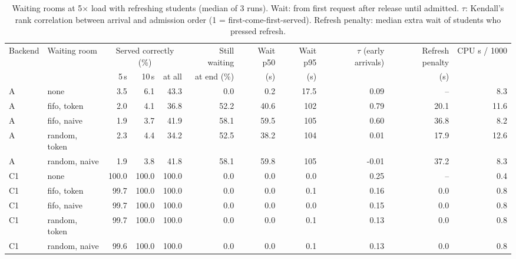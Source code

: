 \begin{table}[t]
\caption{Waiting rooms at 5$\times$ load with refreshing students (median of 3 runs). Wait: from first request after release until admitted. $\tau$: Kendall's rank correlation between arrival and admission order (1 = first-come-first-served). Refresh penalty: median extra wait of students who pressed refresh.}
\label{tab:wr}
\centering
\footnotesize
\begin{tabular}{@{}llrrrrrrrrr@{}}
\toprule
Backend & Waiting room & \multicolumn{3}{c}{Served correctly (\%)} & Still waiting & Wait p50 & Wait p95 & $\tau$ (early arrivals) & Refresh penalty & CPU s / 1000 \\
\cmidrule(lr){3-5}
 & & 5\,s & 10\,s & at all & at end (\%) & (s) & (s) & & (s) & \\
\midrule
A & none & 3.5 & 6.1 & 43.3 & 0.0 & 0.2 & 17.5 & 0.09 & -- & 8.3 \\
A & fifo, token & 2.0 & 4.1 & 36.8 & 52.2 & 40.6 & 102 & 0.79 & 20.1 & 11.6 \\
A & fifo, naive & 1.9 & 3.7 & 41.9 & 58.1 & 59.5 & 105 & 0.60 & 36.8 & 8.2 \\
A & random, token & 2.3 & 4.4 & 34.2 & 52.5 & 38.2 & 104 & 0.01 & 17.9 & 12.6 \\
A & random, naive & 1.9 & 3.8 & 41.8 & 58.1 & 59.8 & 105 & -0.01 & 37.2 & 8.3 \\
\midrule
C1 & none & 100.0 & 100.0 & 100.0 & 0.0 & 0.0 & 0.0 & 0.25 & -- & 0.4 \\
C1 & fifo, token & 99.7 & 100.0 & 100.0 & 0.0 & 0.0 & 0.1 & 0.16 & 0.0 & 0.8 \\
C1 & fifo, naive & 99.7 & 100.0 & 100.0 & 0.0 & 0.0 & 0.0 & 0.15 & 0.0 & 0.8 \\
C1 & random, token & 99.7 & 100.0 & 100.0 & 0.0 & 0.0 & 0.1 & 0.13 & 0.0 & 0.8 \\
C1 & random, naive & 99.6 & 100.0 & 100.0 & 0.0 & 0.0 & 0.1 & 0.13 & 0.0 & 0.8 \\
\bottomrule
\end{tabular}
\end{table}
